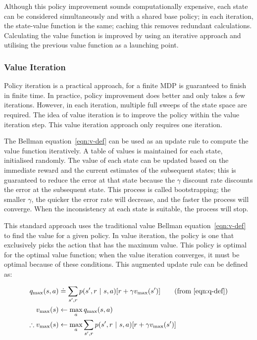 \documentclass[]{final_report}
\begin{document}
Although this policy improvement sounds computationally expensive, each state can be considered simultaneously and with a shared base policy; in each iteration, the state-value function is the same; caching this removes redundant calculations. Calculating the value function is improved by using an iterative approach and utilising the previous value function as a launching point.  


\subsubsection{Value Iteration}

Policy iteration is a practical approach, for a finite MDP is guaranteed to finish in finite time. In practice, policy improvement does better and only takes a few iterations. However, in each iteration, multiple full sweeps of the state space are required. The idea of value iteration is to improve the policy within the value iteration step. This value iteration approach only requires one iteration. 

The Bellman equation~\ref{eqn:v-def} can be used as an update rule to compute the value function iteratively. A table of values is maintained for each state, initialised randomly. The value of each state can be updated based on the immediate reward and the current estimates of the subsequent states; this is guaranteed to reduce the error at that state because the $\gamma$ discount rate discounts the error at the subsequent state. This process is called bootstrapping; the smaller $\gamma$, the quicker the error rate will decrease, and the faster the process will converge. When the inconsistency at each state is suitable, the process will stop. 

This standard approach uses the traditional value Bellman equation~\ref{eqn:v-def} to find the value for a given policy. In value iteration, the policy is one that exclusively picks the action that has the maximum value. This policy is optimal for the optimal value function; when the value iteration converges, it must be optimal because of these conditions. This augmented update rule can be defined as:

\begin{align}
  q_{\text{max}}(s,a)          & \doteq \sum_{s',r}p(s',r\ |\ s, a)[r + \gamma v_{\text{max}}(s')] \tag{from~\ref{eqn:q-def}} \\
  v_{\text{max}}(s)            & \leftarrow  \max_a q_{\text{max}}(s,a) \label{eqn:v-update}                                  \\
  \therefore v_{\text{max}}(s) & \leftarrow  \max_a \sum_{s',r}p(s',r\ |\ s, a)[r + \gamma v_{\text{max}}(s')]
\end{align}
\end{document}
